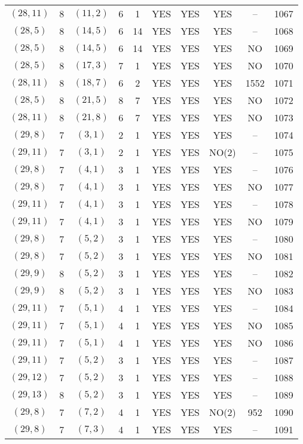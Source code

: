 \begin{longtable}{|c|c|c|c|c|c|c|c|c|c|}
$(28, 11)$ & 8 & $(11, 2)$ & 6 & 1 & YES & YES & YES & -- & 1067\\
$(28, 5)$ & 8 & $(14, 5)$ & 6 & 14 & YES & YES & YES & -- & 1068\\
$(28, 5)$ & 8 & $(14, 5)$ & 6 & 14 & YES & YES & YES & NO & 1069\\
$(28, 5)$ & 8 & $(17, 3)$ & 7 & 1 & YES & YES & YES & NO & 1070\\
$(28, 11)$ & 8 & $(18, 7)$ & 6 & 2 & YES & YES & YES & 1552 & 1071\\
$(28, 5)$ & 8 & $(21, 5)$ & 8 & 7 & YES & YES & YES & NO & 1072\\
$(28, 11)$ & 8 & $(21, 8)$ & 6 & 7 & YES & YES & YES & NO & 1073\\
$(29, 8)$ & 7 & $(3, 1)$ & 2 & 1 & YES & YES & YES & -- & 1074\\
$(29, 11)$ & 7 & $(3, 1)$ & 2 & 1 & YES & YES & NO(2) & -- & 1075\\
$(29, 8)$ & 7 & $(4, 1)$ & 3 & 1 & YES & YES & YES & -- & 1076\\
$(29, 8)$ & 7 & $(4, 1)$ & 3 & 1 & YES & YES & YES & NO & 1077\\
$(29, 11)$ & 7 & $(4, 1)$ & 3 & 1 & YES & YES & YES & -- & 1078\\
$(29, 11)$ & 7 & $(4, 1)$ & 3 & 1 & YES & YES & YES & NO & 1079\\
$(29, 8)$ & 7 & $(5, 2)$ & 3 & 1 & YES & YES & YES & -- & 1080\\
$(29, 8)$ & 7 & $(5, 2)$ & 3 & 1 & YES & YES & YES & NO & 1081\\
$(29, 9)$ & 8 & $(5, 2)$ & 3 & 1 & YES & YES & YES & -- & 1082\\
$(29, 9)$ & 8 & $(5, 2)$ & 3 & 1 & YES & YES & YES & NO & 1083\\
$(29, 11)$ & 7 & $(5, 1)$ & 4 & 1 & YES & YES & YES & -- & 1084\\
$(29, 11)$ & 7 & $(5, 1)$ & 4 & 1 & YES & YES & YES & NO & 1085\\
$(29, 11)$ & 7 & $(5, 1)$ & 4 & 1 & YES & YES & YES & NO & 1086\\
$(29, 11)$ & 7 & $(5, 2)$ & 3 & 1 & YES & YES & YES & -- & 1087\\
$(29, 12)$ & 7 & $(5, 2)$ & 3 & 1 & YES & YES & YES & -- & 1088\\
$(29, 13)$ & 8 & $(5, 2)$ & 3 & 1 & YES & YES & YES & -- & 1089\\
$(29, 8)$ & 7 & $(7, 2)$ & 4 & 1 & YES & YES & NO(2) & 952 & 1090\\
$(29, 8)$ & 7 & $(7, 3)$ & 4 & 1 & YES & YES & YES & -- & 1091\\

\end{longtable}
